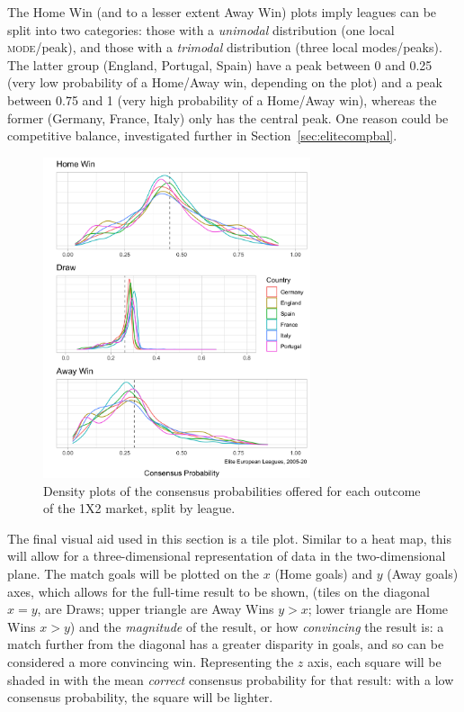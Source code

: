 \documentclass[a4paper,10pt]{report}
\begin{document}
The Home Win (and to a lesser extent Away Win) plots imply leagues can be split into two categories: those with a \textit{unimodal} distribution (one local \textsc{mode}/peak), and those with a \textit{trimodal} distribution (three local modes/peaks). The latter group (England, Portugal, Spain) have a peak between 0 and 0.25 (very low probability of a Home/Away win, depending on the plot) and a peak between 0.75 and 1 (very high probability of a Home/Away win), whereas the former (Germany, France, Italy) only has the central peak. One reason could be competitive balance, investigated further in Section~\ref{sec:elitecompbal}.

\begin{figure}[h!]\begin{center}
	\includegraphics[width=0.7\textwidth]{elite_02_edadens.png}
	\caption{Density plots of the consensus probabilities offered for each outcome of the 1X2 market, split by league.}\label{FIG:01_02_edadensleagues}
\end{center}\end{figure}\vspace{3mm}

The final visual aid used in this section is a tile plot. Similar to a heat map, this will allow for a three-dimensional representation of data in the two-dimensional plane. The match goals will be plotted on the $x$ (Home goals) and $y$ (Away goals) axes, which allows for the full-time result to be shown, (tiles on the diagonal $x=y$, are Draws; upper triangle are Away Wins $y>x$; lower triangle are Home Wins $x>y$) and the \textit{magnitude} of the result, or how \textit{convincing} the result is: a match further from the diagonal has a greater disparity in goals, and so can be considered a more convincing win. Representing the $z$ axis, each square will be shaded in with the mean \textit{correct} consensus probability for that result: with a low consensus probability, the square will be lighter. 
\end{document}
